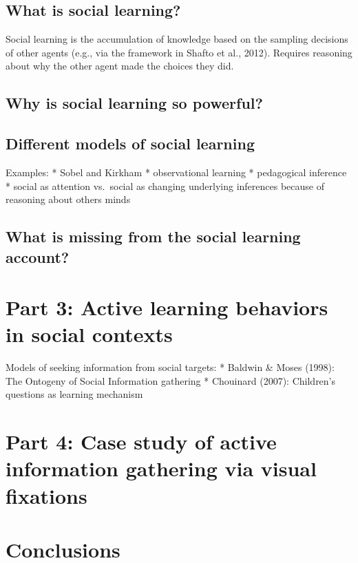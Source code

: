 \documentclass[a4paper,man,apacite,floatsintext]{apa6}
\begin{document}
\subsection{What is social learning?}\label{what-is-social-learning}

Social learning is the accumulation of knowledge based on the sampling
decisions of other agents (e.g., via the framework in Shafto et al.,
2012). Requires reasoning about why the other agent made the choices
they did.

\subsection{Why is social learning so
powerful?}\label{why-is-social-learning-so-powerful}

\subsection{Different models of social
learning}\label{different-models-of-social-learning}

Examples: * Sobel and Kirkham * observational learning * pedagogical
inference * social as attention vs.~social as changing underlying
inferences because of reasoning about others minds

\subsection{What is missing from the social learning
account?}\label{what-is-missing-from-the-social-learning-account}

\section{Part 3: Active learning behaviors in social
contexts}\label{part-3-active-learning-behaviors-in-social-contexts}

Models of seeking information from social targets: * Baldwin \& Moses
(1998): The Ontogeny of Social Information gathering * Chouinard (2007):
Children's questions as learning mechanism

\section{Part 4: Case study of active information gathering via visual
fixations}\label{part-4-case-study-of-active-information-gathering-via-visual-fixations}

\section{Conclusions}\label{conclusions}
\end{document}
